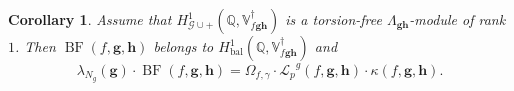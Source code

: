 \documentclass[a4paper,11pt]{amsart}
\theoremstyle{plain}
\newtheorem{corollary}[theorem]{Corollary}
\theoremstyle{definition}
\theoremstyle{remark}
\newcommand{\bb}{\mathbb}
\newcommand{\cl}{\mathcal}
\DeclareMathOperator{\BF}{BF}
\DeclareMathOperator{\bal}{bal}
\DeclareMathOperator{\Frac}{Frac}
\newcommand{\Lp}{{\mathscr{L}_p}}
\newcommand{\hg}{{\mathbf{g}}}
\newcommand{\hh}{{\mathbf h}}
\numberwithin{equation}{section}
\begin{document}
\begin{corollary}\label{corollary:comparison}
    Assume that $H^1_{\cl{G}\cup +}(\bb{Q}, \bb{V}_{f\hg\hh}^\dagger)$ is a torsion-free $\Lambda_{\hg\hh}$-module of rank $1$. Then $\BF(f,\hg,\hh)$ belongs to $H^1_{\bal}(\bb{Q}, \bb{V}_{f\hg\hh}^\dagger)$ and
    \[
    \lambda_{N_g}(\hg)\cdot\BF(f,\hg,\hh)=\Omega_{f,\gamma}\cdot \Lp^g(f,\hg,\hh) \cdot \kappa(f,\hg,\hh).
    \]

\end{corollary}
\end{document}
